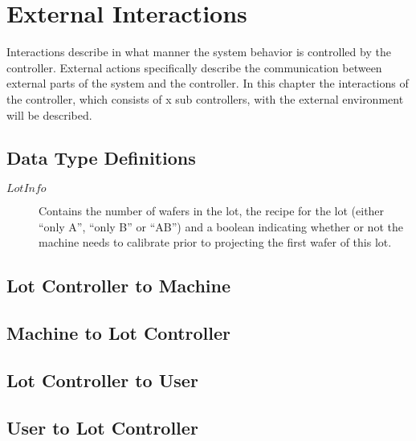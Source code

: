 \section{External Interactions}
Interactions describe in what manner the system behavior is controlled by the controller.
External actions specifically describe the communication between external parts of the system and the controller.
In this chapter the interactions of the controller, which consists of x sub controllers, with the external environment will be described.

\subsection{Data Type Definitions}
\begin{description}
    \item[$LotInfo$] Contains the number of wafers in the lot, the recipe for the lot  (either “only A”, “only B” or “AB”) and a boolean indicating whether or not the machine needs to calibrate prior to projecting the first wafer of this lot.
\end{description}

\subsection{Lot Controller to Machine}

\subsection{Machine to Lot Controller}

\subsection{Lot Controller to User}

\subsection{User to Lot Controller}
